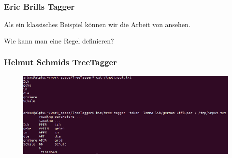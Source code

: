 \begin{frame}
  \frametitle{Eric Brills Tagger}
  
  Als ein klassisches Beispiel können wir die Arbeit von \textcite{brill_simple_1992} ansehen.

  Wie kann man eine Regel definieren?
  
\end{frame}

\begin{frame}
  \frametitle{Helmut Schmids TreeTagger}
  \begin{figure}
    \centering
    \includegraphics[width = \textwidth]{tree_tagger}
  \end{figure}
\end{frame}

\begin{frame}[allowframebreaks]
  \nocite{*}
  \printbibliography
\end{frame}



